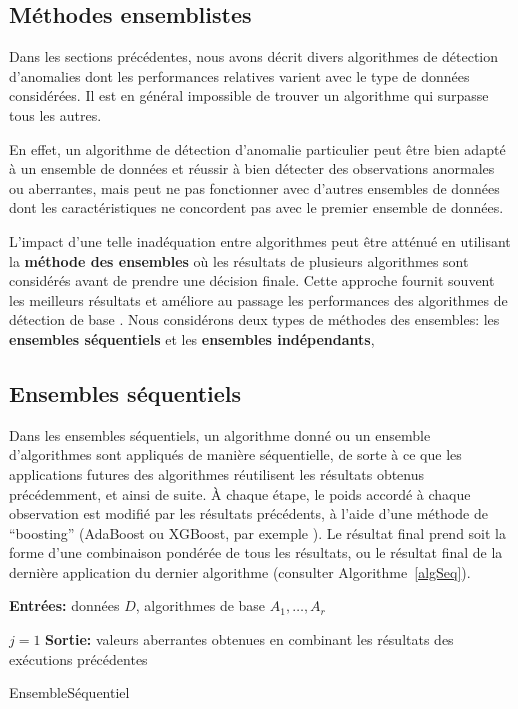 \subsection{Méthodes ensemblistes}
%
%
Dans les sections précédentes, nous avons décrit divers algorithmes de détection d’anomalies dont les performances relatives varient avec le type de données considérées. Il est en g\'en\'eral   impossible de trouver un algorithme qui surpasse tous les autres. \par En effet, un algorithme de détection d'anomalie particulier peut être bien adapté à un ensemble de données et réussir à bien détecter des observations anormales ou aberrantes, mais peut ne pas fonctionner avec d’autres ensembles de données dont les caractéristiques ne concordent pas avec le premier ensemble de données. \par L'impact d'une telle inadéquation  entre algorithmes peut être atténué en utilisant la \textbf{ méthode des ensembles} où les résultats de plusieurs algorithmes sont considérés avant de prendre une décision finale. Cette approche fournit souvent les meilleurs résultats et améliore au passage les performances des algorithmes de d\'etection de base \cite{A10}. 
\newl Nous consid\'erons deux types de méthodes des ensembles: les \textbf{ensembles séquentiels} et les \textbf{ensembles indépendants}, 
\subsection*{Ensembles séquentiels}
Dans les ensembles séquentiels, un algorithme donné ou un ensemble d'algorithmes sont appliqués de manière séquentielle, de sorte \`a ce que les applications futures des algorithmes
réutilisent les résultats obtenus précédemment, et ainsi de suite. \`A chaque \'etape, le poids accord\'e \`a chaque observation est modifi\'e par les r\'esultats pr\'ec\'edents, \`a l'aide d'une m\'ethode de ``boosting'' (AdaBoost ou XGBoost, par exemple \cite{LB}). \newl Le résultat final prend soit la forme d'une combinaison pondérée de tous les résultats, ou le résultat final de la dernière application du dernier algorithme (consulter Algorithme~\ref{algSeq}). 

\begin{algorithm}
\SetAlgoLined
\textbf{Entr\'ees:} données $D$, algorithmes de base $A_1,\ldots,A_r$ 

$j=1$\;
\textbf{Sortie:} valeurs aberrantes obtenues en combinant les résultats des exécutions précédentes 
\caption{EnsembleS\'equentiel}\label{algSeq}
\end{algorithm}%
